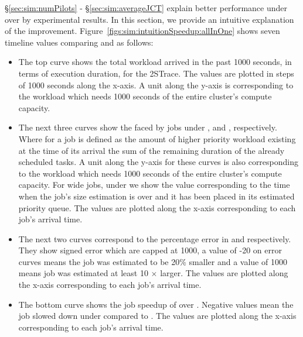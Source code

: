 \S\ref{sec:sim:numPilots} - \S\ref{sec:sim:averageJCT} explain better performance under 
\slearn over \primarybase by experimental results. In this section, we provide
an intuitive explanation of the improvement.
Figure~\ref{figs:sim:intuitionSpeedup:allInOne} shows seven timeline values comparing
\slearn and \primarybase as follows:

\begin{itemize}
	\item The top curve shows the total workload arrived in the past 1000
		seconds, in terms of execution duration, for the 2STrace. The
		values are plotted in steps of 1000 seconds along the x-axis.
		A unit along the y-axis is corresponding to the workload which
		needs 1000 seconds of the entire cluster's compute capacity.
	\item The next three curves show the \resistance faced by jobs under
		\oracle, \primarybase and \slearn, respectively.  Where
		\resistance for a job is defined as the amount of higher
		priority workload existing at the time of its arrival
		 the sum of the remaining duration of the
		already scheduled tasks. A unit along the y-axis for these
		curves is also corresponding to the workload which needs 1000
		seconds of the entire cluster's compute capacity. For wide
		jobs, under \slearn we show the value corresponding to the time
		when the job's size estimation is over and it has been placed
		in its estimated priority queue. The values are plotted along
		the x-axis corresponding to each job's arrival time.
	\item The next two curves correspond to the percentage error in
		\primarybasepredict and \slearn respectively.  They show signed
		error which are capped at 1000, \eg a value of -20 on error
		curves means the job was estimated to be 20\% smaller and a
		value of 1000 means job was estimated at least 10 $\times$
		larger. The values are plotted along the x-axis corresponding
		to each job's arrival time.
	\item The bottom curve shows the job speedup of \slearn over
		\primarybase.  Negative values mean the job slowed down under
		\slearn compared to \primarybase. The values are plotted along
		the x-axis corresponding to each job's arrival time.\\
\end{itemize}

